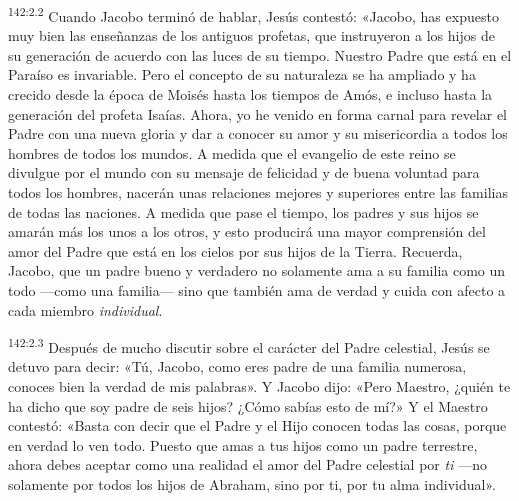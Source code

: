 \par 
\textsuperscript{142:2.2} Cuando Jacobo terminó de hablar, Jesús contestó: «Jacobo, has expuesto muy bien las enseñanzas de los antiguos profetas, que instruyeron a los hijos de su generación de acuerdo con las luces de su tiempo. Nuestro Padre que está en el Paraíso es invariable. Pero el concepto de su naturaleza se ha ampliado y ha crecido desde la época de Moisés hasta los tiempos de Amós, e incluso hasta la generación del profeta Isaías. Ahora, yo he venido en forma carnal para revelar el Padre con una nueva gloria y dar a conocer su amor y su misericordia a todos los hombres de todos los mundos. A medida que el evangelio de este reino se divulgue por el mundo con su mensaje de felicidad y de buena voluntad para todos los hombres, nacerán unas relaciones mejores y superiores entre las familias de todas las naciones. A medida que pase el tiempo, los padres y sus hijos se amarán más los unos a los otros, y esto producirá una mayor comprensión del amor del Padre que está en los cielos por sus hijos de la Tierra. Recuerda, Jacobo, que un padre bueno y verdadero no solamente ama a su familia como un todo ---como una familia--- sino que también ama de verdad y cuida con afecto a cada miembro \textit{individual}.

\par 
\textsuperscript{142:2.3} Después de mucho discutir sobre el carácter del Padre celestial, Jesús se detuvo para decir: «Tú, Jacobo, como eres padre de una familia numerosa, conoces bien la verdad de mis palabras». Y Jacobo dijo: «Pero Maestro, ¿quién te ha dicho que soy padre de seis hijos? ¿Cómo sabías esto de mí?» Y el Maestro contestó: «Basta con decir que el Padre y el Hijo conocen todas las cosas, porque en verdad lo ven todo. Puesto que amas a tus hijos como un padre terrestre, ahora debes aceptar como una realidad el amor del Padre celestial por \textit{ti} ---no solamente por todos los hijos de Abraham, sino por ti, por tu alma individual».

